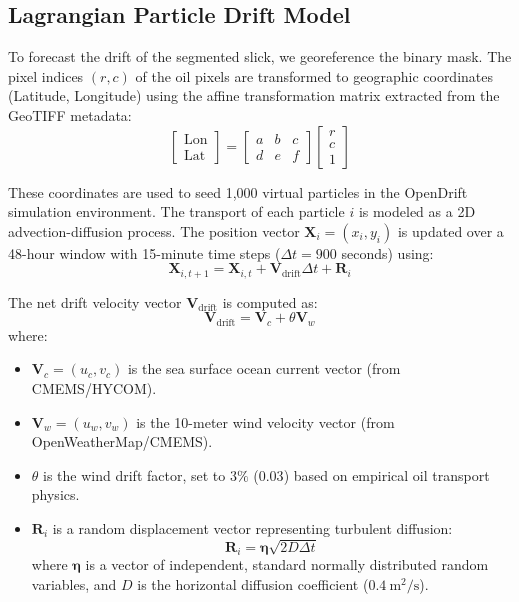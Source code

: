 \documentclass[conference]{IEEEtran}
\begin{document}
\subsection{Lagrangian Particle Drift Model}
To forecast the drift of the segmented slick, we georeference the binary mask. The pixel indices $(r, c)$ of the oil pixels are transformed to geographic coordinates (Latitude, Longitude) using the affine transformation matrix extracted from the GeoTIFF metadata:
\begin{equation}
\begin{bmatrix} \text{Lon} \\ \text{Lat} \end{bmatrix} = \begin{bmatrix} a & b & c \\ d & e & f \end{bmatrix} \begin{bmatrix} r \\ c \\ 1 \end{bmatrix}
\end{equation}

These coordinates are used to seed 1,000 virtual particles in the OpenDrift simulation environment. The transport of each particle $i$ is modeled as a 2D advection-diffusion process. The position vector $\mathbf{X}_i = (x_i, y_i)$ is updated over a 48-hour window with 15-minute time steps ($\Delta t = 900$ seconds) using:
\begin{equation}
\mathbf{X}_{i, t+1} = \mathbf{X}_{i, t} + \mathbf{V}_{\text{drift}} \Delta t + \mathbf{R}_i
\end{equation}

The net drift velocity vector $\mathbf{V}_{\text{drift}}$ is computed as:
\begin{equation}
\mathbf{V}_{\text{drift}} = \mathbf{V}_c + \theta \mathbf{V}_w
\end{equation}
where:
\begin{itemize}
\item $\mathbf{V}_c = (u_c, v_c)$ is the sea surface ocean current vector (from CMEMS/HYCOM).
\item $\mathbf{V}_w = (u_w, v_w)$ is the 10-meter wind velocity vector (from OpenWeatherMap/CMEMS).
\item $\theta$ is the wind drift factor, set to $3\%$ ($0.03$) based on empirical oil transport physics.
\item $\mathbf{R}_i$ is a random displacement vector representing turbulent diffusion:
  \begin{equation}
  \mathbf{R}_i = \mathbf{\eta} \sqrt{2 D \Delta t}
  \end{equation}
  where $\mathbf{\eta}$ is a vector of independent, standard normally distributed random variables, and $D$ is the horizontal diffusion coefficient ($0.4\ \text{m}^2/\text{s}$).
\end{itemize}
\end{document}
